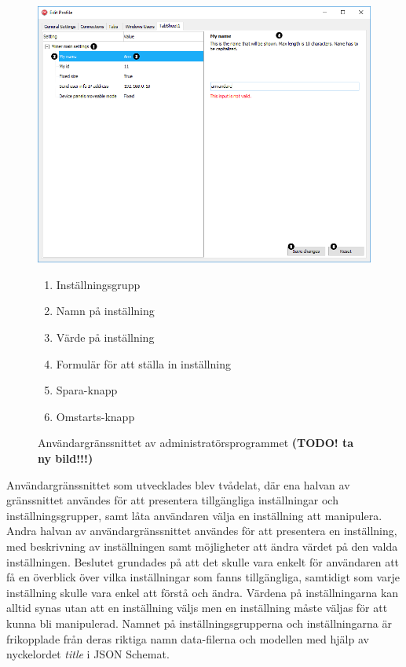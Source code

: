\begin{figure}
	\includegraphics[width=\textwidth]{./images/gui/helhet-copy.png}
	\vspace{-1.7em}
	\caption{Användargränssnittet av administratörsprogrammet \textbf{(TODO! ta ny bild!!!)}}
	\label{fig:gui:helhet}
	\begin{enumerate}
		\item Inställningsgrupp
		\item Namn på inställning
		\item Värde på inställning
		\item Formulär för att ställa in inställning
		\item Spara-knapp
		\item Omstarts-knapp
	\end{enumerate}
\end{figure}

Användargränssnittet som utvecklades blev tvådelat, där ena halvan av gränssnittet användes för att presentera tillgängliga inställningar och inställningsgrupper, samt låta användaren välja en inställning att manipulera. Andra halvan av användargränssnittet användes för att presentera en inställning, med beskrivning av inställningen samt möjligheter att ändra värdet på den valda inställningen. Beslutet grundades på att det skulle vara enkelt för användaren att få en överblick över vilka inställningar som fanns tillgängliga, samtidigt som varje inställning skulle vara enkel att förstå och ändra. Värdena på inställningarna kan alltid synas utan att en inställning väljs men en inställning måste väljas för att kunna bli manipulerad. Namnet på inställningsgrupperna och inställningarna är frikopplade från deras riktiga namn data-filerna och modellen med hjälp av nyckelordet \textit{title} i JSON Schemat.

